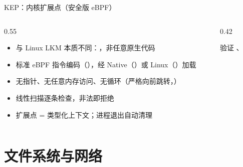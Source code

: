 \documentclass[aspectratio=1610]{beamer}
\begin{document}
\begin{frame}{KEP：内核扩展点（安全版 eBPF）}
    \begin{columns}[t]
        \begin{column}{0.55\textwidth}
            \footnotesize
            \begin{itemize}
                \item 与 Linux LKM 本质不同：，非任意原生代码
                \item 标准 eBPF 指令编码（），经 Native（）或 Linux（）加载
                \item 无指针、无任意内存访问、无循环（严格向前跳转，）
                \item 线性扫描逐条检查，非法即拒绝
                \item 扩展点 = 类型化上下文；进程退出自动清理
            \end{itemize}
            \vspace{0.2em}
        \end{column}
        \begin{column}{0.42\textwidth}
            \vspace{0.3em}
            \begin{block}{验证}
                \footnotesize {}、
            \end{block}
        \end{column}
    \end{columns}
\end{frame}

\renewcommand{\azsectionsummary}{%
    高兼容 VFS：openat2 / renameat2 语义完整，ext4 带 JBD2 日志恢复；%
    lwIP 事件驱动集成，无编译期网络默认值。}
\section{文件系统与网络}
\end{document}
